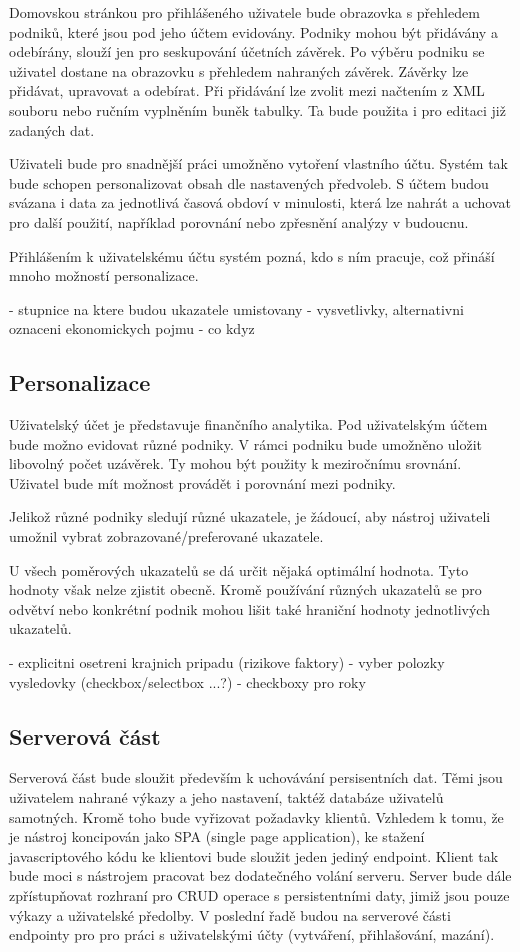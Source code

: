 Domovskou stránkou pro přihlášeného uživatele bude obrazovka s přehledem podniků, které jsou pod jeho účtem evidovány. Podniky mohou být přidávány a odebírány, slouží jen pro seskupování účetních závěrek.
Po výběru podniku se uživatel dostane na obrazovku s přehledem nahraných závěrek. Závěrky lze přidávat, upravovat a odebírat. Při přidávání lze zvolit mezi načtením z XML souboru nebo ručním vyplněním buněk tabulky. Ta bude použita i pro editaci již zadaných dat.  

Uživateli bude pro snadnější práci umožněno vytoření vlastního účtu. Systém tak bude schopen personalizovat obsah dle nastavených předvoleb. S účtem budou svázana i data za jednotlivá časová obdoví v minulosti, která lze nahrát a uchovat pro další použití, například porovnání nebo zpřesnění analýzy v budoucnu.

Přihlášením k uživatelskému účtu systém pozná, kdo s ním pracuje, což přináší mnoho možností personalizace.

- stupnice na ktere budou ukazatele umistovany
- vysvetlivky, alternativni oznaceni ekonomickych pojmu
- co kdyz


\subsection{Personalizace}
Uživatelský účet je představuje finančního analytika. Pod uživatelským účtem bude možno evidovat různé podniky. V rámci podniku bude umožněno uložit libovolný počet uzávěrek. Ty mohou být použity k meziročnímu srovnání.
Uživatel bude mít možnost provádět i porovnání mezi podniky.

Jelikož různé podniky sledují různé ukazatele, je žádoucí, aby nástroj uživateli umožnil vybrat zobrazované/preferované ukazatele. 

U všech poměrových ukazatelů se dá určit nějaká optimální hodnota. Tyto hodnoty však nelze zjistit obecně. Kromě používání různých ukazatelů se pro odvětví nebo konkrétní podnik mohou lišit také hraniční hodnoty jednotlivých ukazatelů.


- explicitni osetreni krajnich pripadu (rizikove faktory)
- vyber polozky vysledovky (checkbox/selectbox ...?)
- checkboxy pro roky


\subsection{Serverová část}
Serverová část bude sloužit především k uchovávání persisentních dat. Těmi jsou uživatelem nahrané výkazy a jeho nastavení, taktéž databáze uživatelů samotných.
Kromě toho bude vyřizovat požadavky klientů. Vzhledem k tomu, že je nástroj koncipován jako SPA (single page application), ke stažení javascriptového kódu ke klientovi bude sloužit jeden jediný endpoint. Klient tak bude moci s nástrojem pracovat bez dodatečného volání serveru. Server bude dále zpřístupňovat rozhraní pro CRUD operace s persistentními daty, jimiž jsou pouze výkazy a uživatelské předolby. V poslední řadě budou na serverové části endpointy pro pro práci s uživatelskými účty (vytváření, přihlašování, mazání).

